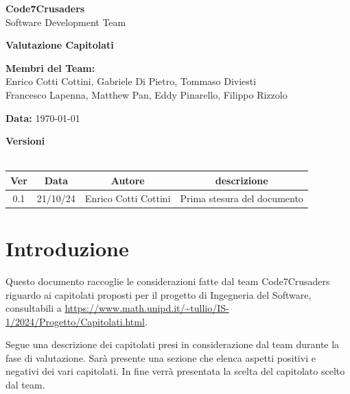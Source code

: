 \documentclass{article}
\begin{document}
\begin{titlepage}
    {\Huge \textbf{Code7Crusaders}}\\
    \vspace{0.5cm}
    {\Large Software Development Team}\\
    \vspace{2cm}
    
    {\large \textbf{Valutazione Capitolati}}\\
    \vspace{5cm}

    \textbf{Membri del Team:}\\
    Enrico Cotti Cottini, Gabriele Di Pietro, Tommaso Diviesti \\
    Francesco Lapenna, Matthew Pan, Eddy Pinarello, Filippo Rizzolo \\
    \vspace{0.5cm}
    
    {\large \textbf{Data:}} \today\\
    
    \vspace{1cm}
\end{titlepage}

\newpage
\begin{center}
    \textbf{Versioni}
    \\
    \\
    \begin{tabular}{|c|c|c|c|}
        \hline
        \textbf{Ver} & \textbf{Data} & \textbf{Autore} & \textbf{descrizione}\\
        \hline
        0.1 & 21/10/24 & Enrico Cotti Cottini & Prima stesura del documento \\
        \hline
    \end{tabular}
\end{center}
\newpage

\section{Introduzione}

Questo documento raccoglie le considerazioni fatte dal team Code7Crusaders 
riguardo ai capitolati proposti per il progetto di Ingegneria del Software, 
consultabili a \url{https://www.math.unipd.it/~tullio/IS-1/2024/Progetto/Capitolati.html}. \newline

Segue una descrizione dei capitolati presi in considerazione dal team durante la fase di valutazione.
Sarà presente una sezione che elenca aspetti positivi e negativi dei vari capitolati.
In fine verrà presentata la scelta del capitolato scelto dal team.
\end{document}
